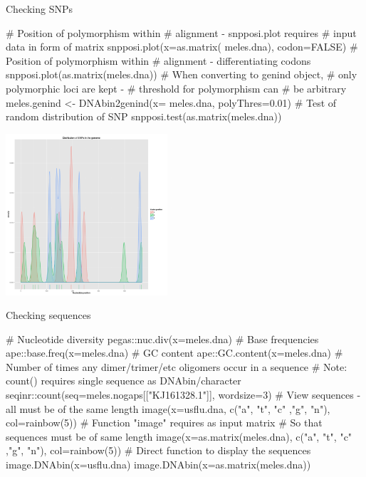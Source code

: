 \documentclass[compress, ucs, xelatex, 11pt, xcolor=svgnames,
  hyperref={
    bookmarks=true,
    unicode=true,
    colorlinks=true,
    pdftitle={Molecular data in R},
    plainpages=false,
    pdfauthor={Vojtech Zeisek},
    pdfsubject={Course about phylogeny and evolution in R},
    pdfcreator={XeLaTeX},
    pdfkeywords={R, evolution, phylogeny, molecular data},
    linkcolor=Tomato,
    anchorcolor=SaddleBrown,
    citecolor=Goldenrod,
    filecolor=DarkMagenta,
    menucolor=Sienna,
    urlcolor=DarkTurquoise,
    pdftex},
  url={hyphens, lowtilde} %
  ]{beamer}
\begin{document}
\begin{frame}[fragile]{Checking SNPs}
\begin{multicols}{2}
  \begin{spluscode}
    # Position of polymorphism within
    # alignment - snpposi.plot requires
    # input data in form of matrix
    snpposi.plot(x=as.matrix(
      meles.dna), codon=FALSE)
    # Position of polymorphism within
    # alignment - differentiating codons
    snpposi.plot(as.matrix(meles.dna))
    # When converting to genind object,
    # only polymorphic loci are kept - 
    # threshold for polymorphism can
    # be arbitrary
    meles.genind <- DNAbin2genind(x=
      meles.dna, polyThres=0.01)
    # Test of random distribution of SNP
    snpposi.test(as.matrix(meles.dna))
  \end{spluscode}
  \begin{flushright}
    \includegraphics[height=6cm]{snpposi.png}
  \end{flushright}
\end{multicols}
\end{frame}

\begin{frame}[fragile]{Checking sequences}
  \begin{spluscode}
    # Nucleotide diversity
    pegas::nuc.div(x=meles.dna)
    # Base frequencies
    ape::base.freq(x=meles.dna)
    # GC content
    ape::GC.content(x=meles.dna)
    # Number of times any dimer/trimer/etc oligomers occur in a sequence
    # Note: count() requires single sequence as DNAbin/character
    seqinr::count(seq=meles.nogaps[["KJ161328.1"]], wordsize=3)
    # View sequences - all must be of the same length
    image(x=usflu.dna, c("a", "t", "c" ,"g", "n"), col=rainbow(5))
    # Function "image" requires as input matrix
    # So that sequences must be of same length
    image(x=as.matrix(meles.dna), c("a", "t", "c" ,"g", "n"),
      col=rainbow(5))
    # Direct function to display the sequences
    image.DNAbin(x=usflu.dna)
    image.DNAbin(x=as.matrix(meles.dna))
  \end{spluscode}
\end{frame}
\end{document}
